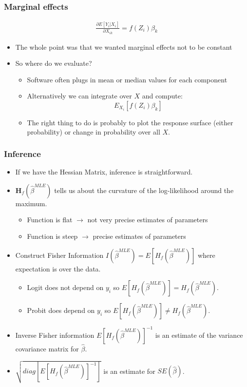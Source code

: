 \documentclass[aspectratio=169]{beamer}
\begin{document}
\begin{frame}
\frametitle{Marginal effects}
\begin{eqnarray*}
\frac{\partial E[Y_i | X_i] }{\partial X_{ik}} = f (Z_i) \beta_k
\end{eqnarray*}
\begin{itemize}
\item The whole point was that we wanted marginal effects not to be constant
\item So where do we evaluate?
\begin{itemize}
\item Software often plugs in mean or median values for each component
\item Alternatively we can integrate over $X$ and compute:
$$
E_{X_i}[ f (Z_i) \beta_k]
$$
\item The right thing to do is probably to plot the response surface (either probability) or change in probability over all $X$.
\end{itemize}
\end{itemize}
\end{frame}

\begin{frame}
\frametitle{Inference}
\begin{itemize} 
\item If we have the Hessian Matrix, inference is straightforward.
\item $\mathbf{H}_f(\hat{\beta}^{MLE})$ tells us about the \alert{curvature} of the log-likelihood around the maximum.
\begin{itemize}
\item Function is flat $\rightarrow$ not very precise estimates of parameters
\item Function is steep $\rightarrow$  precise estimates of parameters
\end{itemize}
\item Construct \alert{Fisher Information} $I(\hat{\beta}^{MLE}) = E[H_f(\hat{\beta}^{MLE})]$ where expectation is over the data.
\begin{itemize}
\item Logit does not depend on $y_i$ so $E[H_f(\hat{\beta}^{MLE})]=H_f(\hat{\beta}^{MLE})$.
\item Probit does depend on $y_i$ so $E[H_f(\hat{\beta}^{MLE})]\neq H_f(\hat{\beta}^{MLE})$.
\end{itemize}
\item Inverse Fisher information $E[H_f(\hat{\beta}^{MLE})]^{-1}$ is an estimate of the variance covariance matrix for $\hat{\beta}$.
\item $\sqrt{diag[E[H_f(\hat{\beta}^{MLE})]^{-1}]}$ is an estimate for $SE(\hat{\beta})$.
\end{itemize}
\end{frame}
\end{document}
